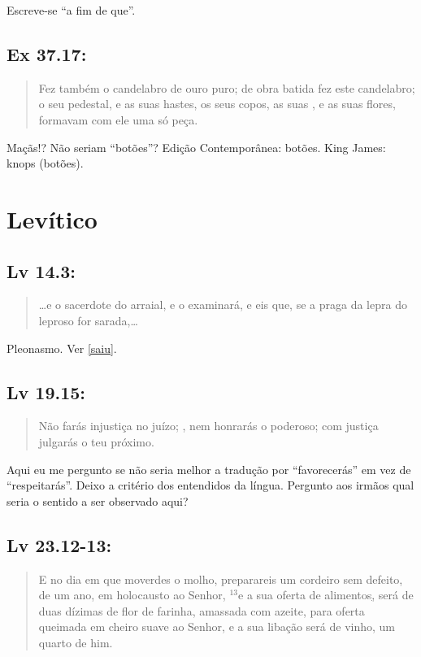 Escreve-se ``a fim de que''.


\subsection{Ex 37.17:}
\begin{quote}
    \small
Fez também o candelabro de ouro puro; de obra batida fez este candelabro; o seu pedestal, e as suas hastes, os seus copos, as suas , e as suas flores, formavam com ele uma só peça.
\end{quote}

Maçãs!? Não seriam ``botões''? Edição Contemporânea: botões. King James:
knops (botões).

\section{Levítico}
\subsection{Lv 14.3:}
\begin{quote}
    \small
\ldots e o sacerdote  do arraial, e o examinará, e eis que, se a praga da lepra do leproso for sarada,\ldots
\end{quote}

Pleonasmo. Ver \ref{saiu}.

\subsection{Lv 19.15:}
\begin{quote}
    \small
Não farás injustiça no juízo; , nem honrarás o poderoso; com justiça julgarás o teu próximo.
\end{quote}

Aqui eu me pergunto se não seria melhor a tradução por ``favorecerás'' em
vez de ``respeitarás''. Deixo a critério dos entendidos da língua. Pergunto aos irmãos qual seria o sentido a ser observado aqui?

\subsection{Lv 23.12-13:}
\begin{quote}
    \small
E no dia em que moverdes o molho, preparareis um cordeiro sem defeito, de um ano, em holocausto ao Senhor, $^{\mathrm{13}}$e a sua oferta de alimentos\uline{,} será de duas dízimas de flor de farinha, amassada com azeite, para oferta queimada em cheiro suave ao Senhor, e a sua libação será de vinho, um quarto de him.
\end{quote}

